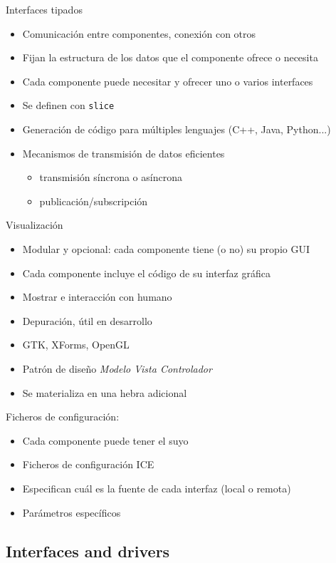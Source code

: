 \documentclass[twocolumn]{svjour3}          %
\begin{document}
Interfaces tipados
\begin{itemize}
\item {Comunicación entre componentes}, conexión con otros 
\item Fijan la estructura de los datos que el componente ofrece o necesita
\item Cada componente puede necesitar y ofrecer uno o varios interfaces 
\item Se definen con \texttt{slice}
\item Generación de código para múltiples lenguajes (C++, Java, Python...)
\item Mecanismos de transmisión de datos eficientes
\begin{itemize}
\item transmisión síncrona o asíncrona
\item publicación/subscripción
\end{itemize}
\end{itemize}


Visualización
\begin{itemize}
\item {Modular} y {opcional}: cada componente tiene (o no) su propio GUI
\item Cada componente incluye el código de su interfaz gráfica
\item Mostrar e interacción con humano 
\item Depuración, útil en desarrollo
\item GTK, XForms, OpenGL
\item Patrón de diseño \textit{Modelo Vista Controlador}
\item Se materializa en una {hebra adicional}
\end{itemize}



Ficheros de configuración:
\begin{itemize}
\item Cada componente puede tener el suyo 
\item Ficheros de configuración ICE
\item Especifican cuál es la fuente de cada interfaz (local o remota)
\item Parámetros específicos
\end{itemize}

\subsection{Interfaces and drivers}
\end{document}

